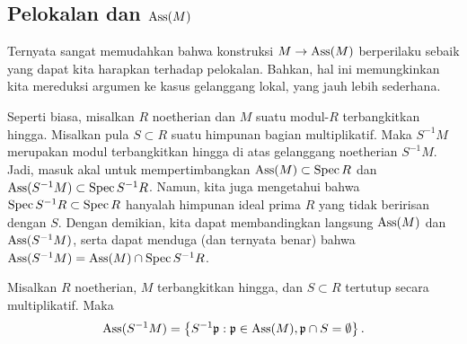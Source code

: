 \subsection{Pelokalan dan $\operatorname{Ass}(M)$}

Ternyata sangat memudahkan bahwa konstruksi $M  \to \operatorname{Ass}(M)$
berperilaku sebaik yang dapat kita harapkan terhadap
pelokalan. Bahkan, hal ini memungkinkan kita mereduksi argumen ke kasus gelanggang lokal,
yang jauh lebih sederhana.

Seperti biasa, misalkan $R $ noetherian dan $M$ suatu modul-$R$ terbangkitkan hingga. 
Misalkan pula $S \subset R$ suatu himpunan bagian multiplikatif. 
Maka $S^{-1}M$ merupakan modul terbangkitkan hingga di atas gelanggang noetherian
$S^{-1}M$. Jadi, masuk akal untuk mempertimbangkan $\operatorname{Ass}(M) \subset \operatorname{Spec} R$ dan
$\operatorname{Ass}(S^{-1}M) \subset \operatorname{Spec} S^{-1}R$. Namun, kita juga mengetahui bahwa $\operatorname{Spec} S^{-1}R
\subset \operatorname{Spec} R$ hanyalah himpunan ideal prima $R$ yang tidak beririsan dengan $S$.
Dengan demikian, kita dapat membandingkan langsung $\operatorname{Ass}(M)$ dan $\operatorname{Ass}(S^{-1}M)$, serta dapat
menduga (dan ternyata benar) bahwa $\operatorname{Ass}(S^{-1}M) = \operatorname{Ass}(M) \cap \operatorname{Spec}
S^{-1}R$.
\begin{proposition} \label{assmlocalization}
Misalkan $R$ noetherian, $M$ terbangkitkan hingga, dan $S \subset R$ tertutup secara multiplikatif. 
Maka 
\[ \operatorname{Ass}(S^{-1}M)  = \left\{S^{-1}\mathfrak{p}: \mathfrak{p} \in \operatorname{Ass}(M),
\mathfrak{p}\cap S  = \emptyset \right\} . \]
\end{proposition} 
